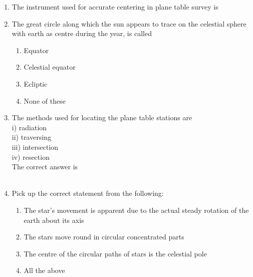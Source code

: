 \documentclass[11pt,a4paper]{article}
\begin{document}
\begin{enumerate}
\item{The instrument used for accurate centering in plane table survey is}
\\
\item{The great circle along which the sun appears to trace on the celestial sphere with earth as centre during the year, is called}
\begin{enumerate}[label=\Alph*.]
\item{Equator}
\item{Celestial equator}
\item{Ecliptic}
\item{None of these}
\end{enumerate}
\item{The methods used for locating the plane table stations are \\
i) radiation \\
ii) traversing \\
iii) intersection \\
iv) resection \\
The correct answer is \\
}
\\
\item{Pick up the correct statement from the following:}
\begin{enumerate}[label=\Alph*.]
\item{The star's movement is apparent due to the actual steady rotation of the earth about its axis}
\item{The stars move round in circular concentrated parts}
\item{The centre of the circular paths of stars is the celestial pole}
\item{All the above}
\end{enumerate}

\end{enumerate}
\end{document}
